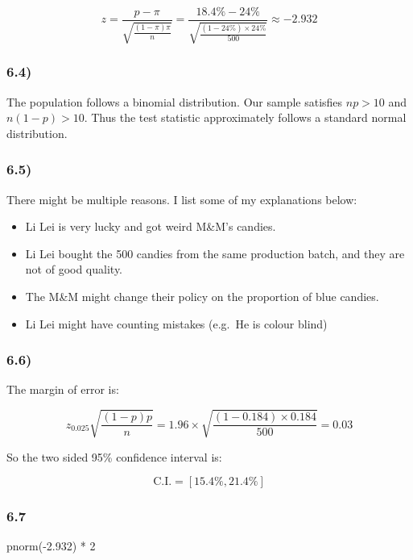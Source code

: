 \documentclass[
]{article}
\newenvironment{Shaded}{\begin{snugshade}}{\end{snugshade}}
\newcommand{\DecValTok}[1]{\textcolor[rgb]{0.00,0.00,0.81}{#1}}
\newcommand{\FloatTok}[1]{\textcolor[rgb]{0.00,0.00,0.81}{#1}}
\newcommand{\FunctionTok}[1]{\textcolor[rgb]{0.00,0.00,0.00}{#1}}
\newcommand{\NormalTok}[1]{#1}
\newcommand{\SpecialCharTok}[1]{\textcolor[rgb]{0.00,0.00,0.00}{#1}}
\begin{document}
\[
z = \frac{p - \pi}{\sqrt{\frac{( 1 - \pi) \pi}{n}}} = \frac{18.4\% - 24\%}{\sqrt{\frac{(1-24\% ) \times 24\%}{500}}} \approx -2.932
\]

\hypertarget{section-8}{%
\subsubsection{6.4)}\label{section-8}}

The population follows a binomial distribution. Our sample satisfies
\(np > 10\) and \(n(1-p) > 10\). Thus the test statistic approximately
follows a standard normal distribution.

\hypertarget{section-9}{%
\subsubsection{6.5)}\label{section-9}}

There might be multiple reasons. I list some of my explanations below:

\begin{itemize}
\item
  Li Lei is very lucky and got weird M\&M's candies.
\item
  Li Lei bought the 500 candies from the same production batch, and they
  are not of good quality.
\item
  The M\&M might change their policy on the proportion of blue candies.
\item
  Li Lei might have counting mistakes (e.g.~He is colour blind)
\end{itemize}

\hypertarget{section-10}{%
\subsubsection{6.6)}\label{section-10}}

The margin of error is:

\[
z_{0.025} \sqrt{\frac{(1-p)p}{n}} = 1.96 \times \sqrt{\frac{(1-0.184) \times 0.184}{500}} = 0.03
\]

So the two sided 95\% confidence interval is:

\[
\text{C.I.} = [15.4\%, 21.4 \%]
\]

\hypertarget{section-11}{%
\subsubsection{6.7}\label{section-11}}

\begin{Shaded}
\begin{Highlighting}[]
\FunctionTok{pnorm}\NormalTok{(}\SpecialCharTok{{-}}\FloatTok{2.932}\NormalTok{) }\SpecialCharTok{*} \DecValTok{2}
\end{Highlighting}
\end{Shaded}
\end{document}
